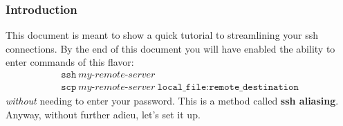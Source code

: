 \documentclass{article}
\begin{document}
\subsubsection*{Introduction}
This document is meant to show a quick tutorial to streamlining your ssh connections.
By the end of this document you will have enabled the ability to enter commands of this flavor:
\begin{gather*}
\mathrm{\texttt{ssh} \ \textit{my-remote-server}} \\
\mathrm{\texttt{scp} \ \textit{my-remote-server} \ \texttt{local\_file}:\texttt{remote\_destination}}
\end{gather*}
\textit{without} needing to enter your password. This is a method called \textbf{ssh aliasing}.
Anyway, without further adieu, let's set it up. \\ \\
\end{document}
